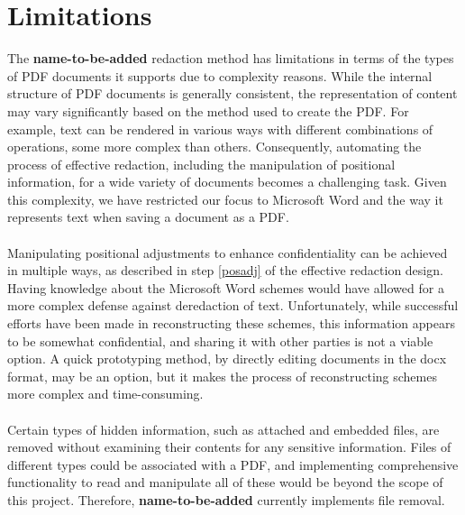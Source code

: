 \section{Limitations}
The \textbf{name-to-be-added} redaction method has limitations in terms of the types of PDF documents it supports due to complexity reasons. While the internal structure of PDF documents is generally consistent, the representation of content may vary significantly based on the method used to create the PDF. For example, text can be rendered in various ways with different combinations of operations, some more complex than others. Consequently, automating the process of effective redaction, including the manipulation of positional information, for a wide variety of documents becomes a challenging task. Given this complexity, we have restricted our focus to Microsoft Word and the way it represents text when saving a document as a PDF.
\\\\
Manipulating positional adjustments to enhance confidentiality can be achieved in multiple ways, as described in step \ref{posadj} of the effective redaction design. Having knowledge about the Microsoft Word schemes would have allowed for a more complex defense against deredaction of text. Unfortunately, while successful efforts have been made in reconstructing these schemes, this information appears to be somewhat confidential, and sharing it with other parties is not a viable option. A quick prototyping method, by directly editing documents in the docx format, may be an option, but it makes the process of reconstructing schemes more complex and time-consuming. 
\\\\
Certain types of hidden information, such as attached and embedded files, are removed without examining their contents for any sensitive information. Files of different types could be associated with a PDF, and implementing comprehensive functionality to read and manipulate all of these would be beyond the scope of this project. Therefore, \textbf{name-to-be-added} currently implements file removal.
